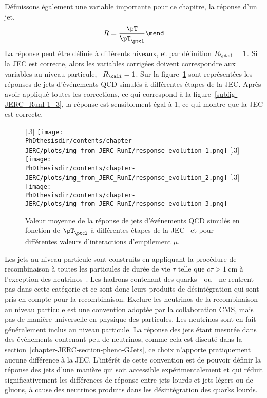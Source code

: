 Définissons également une variable importante pour ce chapitre, la réponse d'un jet,
\begin{equation}
R = \frac{\pT}{\pT_\ptcl}
\mend
\end{equation}
La réponse peut être définie à différents niveaux, et par définition $R_\ptcl=1$.
Si la JEC est correcte, alors les variables corrigées doivent correspondre aux variables au niveau particule, \ie\ $R_\cali=1$.
Sur la figure~\ref{fig-JERC_RunI-1} sont représentées les réponses de jets d'événements QCD simulés à différentes étapes de la JEC. Après avoir appliqué toutes les corrections, ce qui correspond à la figure~\ref{subfig-JERC_RunI-1_3}, la réponse est sensiblement égal à 1, ce qui montre que la JEC est correcte.
\begin{figure}[h]
\centering
{}[.3\textwidth]
{\texttt{[image: \\PhDthesisdir/contents/chapter-JERC/plots/img\_from\_JERC\_RunI/response\_evolution\_1.png]}}
\hfill
{}[.3\textwidth]
{\texttt{[image: \\PhDthesisdir/contents/chapter-JERC/plots/img\_from\_JERC\_RunI/response\_evolution\_2.png]}}
\hfill
{}[.3\textwidth]
{\texttt{[image: \\PhDthesisdir/contents/chapter-JERC/plots/img\_from\_JERC\_RunI/response\_evolution\_3.png]}}
\caption[Valeur moyenne de la réponse de jets d'événements QCD simulés.]{Valeur moyenne de la réponse de jets d'événements QCD simulés en fonction de $\pT_\ptcl$ à différentes étapes de la JEC~\cite{JERC_RunI} et pour différentes valeurs d'interactions d'empilement $\mu$.}
\label{fig-JERC_RunI-1}
\end{figure}
\par Les jets au niveau particule sont construits en appliquant la procédure de recombinaison à toutes les particules de durée de vie $\tau$ telle que $c\tau>\SI{1}{\centi\meter}$ à l'exception des neutrinos~\cite{JERC_RunI}.
Les hadrons contenant des quarks~\quarkc\ ou~\quarkb\ ne rentrent pas dans cette catégorie et ce sont donc leurs produits de désintégration qui sont pris en compte pour la recombinaison.
Exclure les neutrinos de la recombinaison au niveau particule est une convention adoptée par la collaboration CMS, mais pas de manière universelle en physique des particules.
Les neutrinos sont en fait généralement inclus au niveau particule.
La réponse des jets étant mesurée dans des événements contenant peu de neutrinos, comme cela est discuté dans la section~\ref{chapter-JERC-section-pheno-GJets}, ce choix n'apporte pratiquement aucune différence à la JEC.
L'intérêt de cette convention est de pouvoir définir la réponse des jets d'une manière qui soit accessible expérimentalement et qui réduit significativement les différences de réponse entre jets lourds et jets légers ou de gluons, à cause des neutrinos produits dans les désintégration des quarks lourds.
